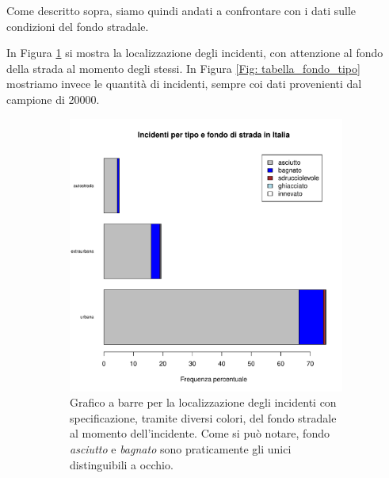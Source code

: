 \documentclass[12pt,a4paper,final,oneside]{article}			%
\begin{document}
        Come descritto sopra, siamo quindi andati a confrontare con i dati sulle condizioni del fondo stradale. 

        In Figura \ref{Fig: localizzazione_per_fondo} si mostra la localizzazione degli incidenti, con attenzione al fondo della strada al momento degli stessi. In Figura \ref{Fig: tabella_fondo_tipo} mostriamo invece le quantità di incidenti, sempre coi dati provenienti dal campione di 20000.
        \begin{figure}[h]
            \begin{subfigure}{0.4\textwidth}
                \centering
                \includegraphics[scale=0.4]{../results/localizzazione_fondo.pdf}
                \caption{Grafico a barre per la localizzazione degli incidenti con specificazione, tramite diversi colori, del fondo stradale al momento dell'incidente. Come si può notare, fondo \textit{asciutto} e \textit{bagnato} sono praticamente gli unici distinguibili a occhio.}
                \label{Fig: localizzazione_per_fondo}
            \end{subfigure}
            \hfill
            \begin{subfigure}{0.4\textwidth}
                \centering

\end{subfigure}
\end{figure}
\end{document}
